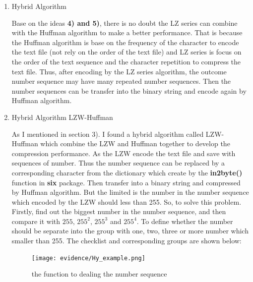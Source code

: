 \documentclass[margin 2cm]{report}
\begin{document}
\begin{enumerate}
\begin{spacing}{1.5}
\newline Thus, based on the advantage behind (Hybrid LZW-Huffman and LZ77-Huffman algorithms will be mentioned as the idea later). The when compressing different kinds of text file, it can first compress by all the algorithm and compare them to choose a shortest one and finished the compression.
\end{spacing}

\normalsize\item[4)]{Hybrid Algorithm}
\begin{spacing}{1.5}
\normalsize\indent\setlength{\parindent}{2em}Base on the ideas \textbf{4) and 5)}, there is no doubt the LZ series can combine with the Huffman algorithm to make a better performance. That is because the Huffman algorithm is base on the frequency of the character to encode the text file (not rely on the order of the text file) and LZ series is focus on the order of the text sequence and the character repetition to compress the text file. Thus, after encoding by the LZ series algorithm, the outcome number sequence may have many repeated number sequences. Then the number sequences can be transfer into the binary string and encode again by Huffman algorithm.
\end{spacing}

\normalsize\item[5)]{Hybrid Algorithm LZW-Huffman}
\begin{spacing}{1.5}
\normalsize\indent\setlength{\parindent}{2em}As I mentioned in section 3). I found a hybrid algorithm called LZW-Huffman which combine the LZW and Huffman together to develop the compression performance. As the LZW encode the text file and save with sequences of number. Thus the number sequence can be replaced by a corresponding character from the dictionary which create by the \textbf{in2byte()} function in \textbf{six} package. Then transfer into a binary string and compressed by Huffman algorithm. But the limited is the number in the number sequence which encoded by the LZW should less than 255. So, to solve this problem. Firstly, find out the biggest number in the number sequence, and then compare it with $255$, $255^{2}$, $255^{3}$  and  $255^{4}$. To define whether the number should be separate into the group with one, two, three or more number which smaller than 255. The checklist and corresponding groups are shown below:
\end{spacing}

\begin{figure}[H]
\centering
\label{Fig.sub.1}\texttt{[image: evidence/Hy\_example.png]}
\caption{the function to dealing the number sequence}
\label{Fig.main}
\end{figure}


\end{enumerate}
\end{document}
